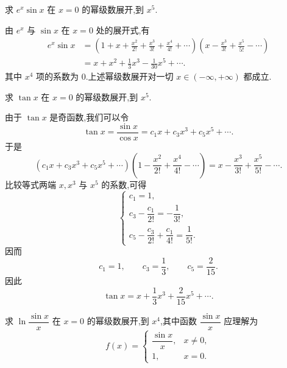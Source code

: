 \begin{example}[例 10.4.4]
	求 $e^x\sin x$ 在 $x=0$ 的幂级数展开,到 $x^5$.
\end{example}

\begin{solution}
	由 $e^x$ 与 $\sin x$ 在 $x=0$ 处的展开式,有
	\[
	\begin{aligned}
		e^x\sin x
		&=\left(1+x+\frac{x^2}{2!}+\frac{x^3}{3!}+\frac{x^4}{4!}+\cdots\right)
		\left(x-\frac{x^3}{3!}+\frac{x^5}{5!}-\cdots\right)\\
		&=x+x^2+\frac{1}{3}x^3-\frac{1}{30}x^5+\cdots .
	\end{aligned}
	\]
	其中 $x^4$ 项的系数为 $0$.上述幂级数展开对一切 $x\in(-\infty,+\infty)$ 都成立.
\end{solution}

\begin{example}
	求 $\tan x$ 在 $x=0$ 的幂级数展开,到 $x^5$.
\end{example}

\begin{solution}
	由于 $\tan x$ 是奇函数,我们可以令
	\[
	\tan x=\frac{\sin x}{\cos x}=c_1x+c_3x^3+c_5x^5+\cdots .
	\]
	于是
	\[
	\left(c_1x+c_3x^3+c_5x^5+\cdots\right)
	\left(1-\frac{x^2}{2!}+\frac{x^4}{4!}-\cdots\right)
	=x-\frac{x^3}{3!}+\frac{x^5}{5!}-\cdots .
	\]
	比较等式两端 $x,x^3$ 与 $x^5$ 的系数,可得
	\[
	\begin{cases}
		c_1=1,\\[4pt]
		c_3-\dfrac{c_1}{2!}=-\dfrac{1}{3!},\\[8pt]
		c_5-\dfrac{c_3}{2!}+\dfrac{c_1}{4!}=\dfrac{1}{5!}.
	\end{cases}
	\]
	因而
	\[
	c_1=1,
	\qquad
	c_3=\frac{1}{3},
	\qquad
	c_5=\frac{2}{15}.
	\]
	因此
	\[
	\tan x=x+\frac{1}{3}x^3+\frac{2}{15}x^5+\cdots .
	\]
\end{solution}

\begin{example}
	求 $\ln \dfrac{\sin x}{x}$ 在 $x=0$ 的幂级数展开,到 $x^4$,其中函数 $\dfrac{\sin x}{x}$ 应理解为
	\[
	f(x)=
	\begin{cases}
		\dfrac{\sin x}{x},&x\neq0,\\[6pt]
		1,&x=0.
	\end{cases}
	\]
\end{example}

